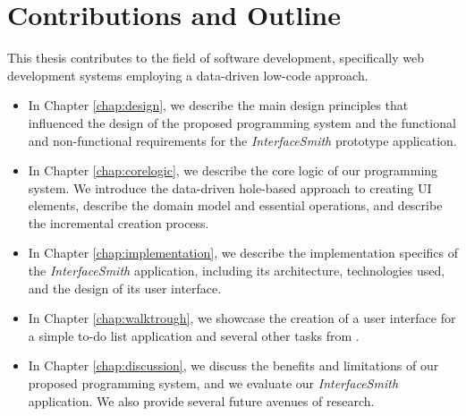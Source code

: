 \section* {Contributions and Outline}
This thesis contributes to the field of software development, specifically web development systems employing a data-driven low-code approach.
\begin{itemize}
	\item In Chapter \ref{chap:design}, we describe the main design principles that influenced the design of the
	      proposed programming system and the functional and non-functional requirements for the \emph{InterfaceSmith} prototype application.
	\item {In Chapter \ref{chap:corelogic}, we describe the core logic of our programming system.
	      We introduce the data-driven hole-based approach to creating UI elements, describe the domain model and essential operations,
	      and describe the incremental creation process.}
	\item In Chapter \ref{chap:implementation}, we describe the implementation specifics of the \emph{InterfaceSmith} application, including its architecture, technologies used, and the design of its user interface.
	\item In Chapter \ref{chap:walktrough}, we showcase the creation of a user interface for a simple to-do list application and several other tasks from \citet{7GUIs-web}.
	\item In Chapter \ref{chap:discussion}, we discuss the benefits and limitations of our proposed programming system, and we evaluate our \emph{InterfaceSmith} application.
	      We also provide several future avenues of research.
\end{itemize}
